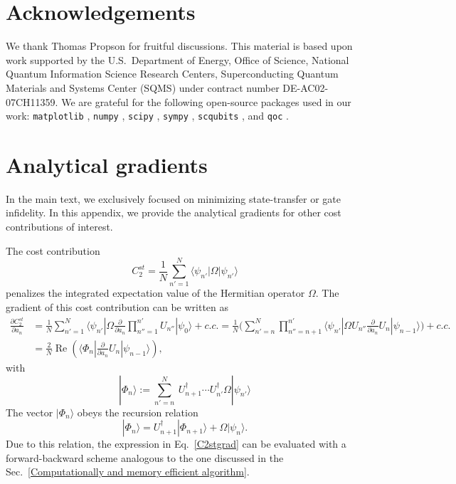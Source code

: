 \documentclass[letterpaper,10pt]{iopart}
\DeclareMathOperator{\Real}{Re}
\newcommand{\dket}[1]{|#1\rangle}
\newcommand{\dbra}[1]{\langle#1|}
\begin{document}
\section*{Acknowledgements}
We thank Thomas Propson for fruitful discussions. This material is based upon work supported by the U.S.\  Department of Energy, Office of Science, National Quantum Information Science Research Centers, Superconducting Quantum Materials and Systems Center (SQMS) under contract number DE-AC02-07CH11359. We are grateful for the following open-source packages used in our work: \texttt{matplotlib} \cite{hunter2007matplotlib}, \texttt{numpy} \cite{harris2020array}, \texttt{scipy}  \cite{virtanen2020scipy}, \texttt{sympy}  \cite{meurer2017sympy}, \texttt{scqubits} \cite{groszkowski2021scqubits}, and 
 \texttt{qoc}  \cite{pacqoc}.


\appendix

\section{Analytical gradients}
\label{gradient}
In the main text, we exclusively focused on minimizing state-transfer or gate infidelity. In this appendix, we provide the analytical gradients for other cost contributions of interest. 

The cost contribution 
\begin{equation}
\label{c2st}
C_2^{st}=\frac{1}{N}\sum_{n'=1}^N \dbra{\psi_{n'}}\Omega \dket{\psi_{n'}}
\end{equation} 
penalizes the integrated expectation value of the Hermitian operator $\Omega$. The gradient of this cost contribution can be written as
\begin{align}
\nonumber \frac{\partial C_{2}^{st} }{\partial a_{n}}
&=\frac{1}{N}\sum_{n'=1}^N \dbra{\psi_{n'}}\Omega \frac{\partial }{\partial a_{n}}\prod_{n''=1}^{n'}U_{n''}\dket{\psi_{0}}+c.c.=\frac{1}{N}\bigg(\sum_{n'=n}^N \prod_{n''=n+1}^{n'} \dbra{\psi_{n'}}\Omega U_{n''} \frac{\partial }{\partial a_{n}}U_n\dket{\psi_{n-1}}\bigg)+c.c.\\
\label{C2stgrad} &=\frac{2}{N}\Real (\dbra{\Phi_{n}}\frac{\partial }{\partial a_{n}}U_n \dket{\psi_{n-1}}),
\end{align}
with
\begin{equation}
    \dket{\Phi_n}:=\sum_{n'= n}^N~ U_{n+1}^\dagger \cdots U_{n'}^\dagger \Omega\dket{\psi_{n'}}
\end{equation}
The vector $\dket{\Phi_n}$ obeys the recursion relation
\begin{equation}
    \dket{\Phi_n}=U_{n+1}^\dagger \dket{\Phi_{n+1}}+\Omega \dket{\psi_n}.
\end{equation}
Due to this relation, the expression in Eq.\ \eqref{C2stgrad} can be evaluated with a forward-backward scheme analogous to the one discussed in the Sec.\ \ref{Computationally and memory efficient algorithm}.
\end{document}
